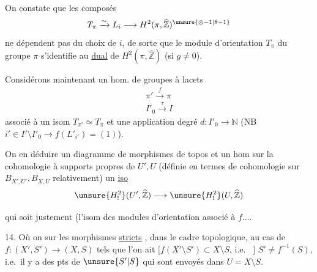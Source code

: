
On constate que les composés
\[
T_\pi \xrightarrow{\sim} L_i \longrightarrow
H^2(\pi,\widehat{\mathbb Z})^{\unsure{\otimes-1|\theta-1}}
\]
ne dépendent pas du choix de $i$, de sorte que le module d'orientation $T_\pi$ du groupe   $\pi$ s'identifie au \uline{dual} de $H^2(\pi,\widehat{\mathbb Z})$ (si $g\ne0$).

Considérons maintenant un hom. de groupes à lacets
\[
\begin{gathered}
\pi'\xrightarrow{f}\pi\\
I'_0\xrightarrow{\tau}I
\end{gathered}
\]
associé à un isom $T_{\pi'}\simeq T_\pi$ et une application degré
$d:I'_0\longrightarrow\mathbb N$
(NB $i'\in I'\setminus I'_0\longrightarrow f(L'_{i'})=(1)$).

On  en déduire un diagramme de morphismes de topos
et un hom \uline{} sur la cohomologie à supports propres de $U',U$ (définie en termes de cohomologie sur $B_{X',U'}, B_{X,U}$ relativement)
   un \uline{iso}
\[
\unsure{H^2_!}(U',\widehat{\mathbb Z})\longrightarrow
\unsure{H^2_!}(U,\widehat{\mathbb Z})
\]


qui soit justement  (l'isom des modules d'orientation associé à $f$....

14. Où on  sur les morphismes  \uline{stricts} , dans le cadre topologique, au cas de
$f:(X',S')\longrightarrow(X,S)$ tels que l'on ait
$[f(X'\setminus S')\subset X\setminus S$, i.e.\  $]$
 $S'\ne f^{-1}(S)$, i.e.\ il y a des pts de $\unsure{S'|S}$ qui sont envoyés dans $U=X\setminus S$.

